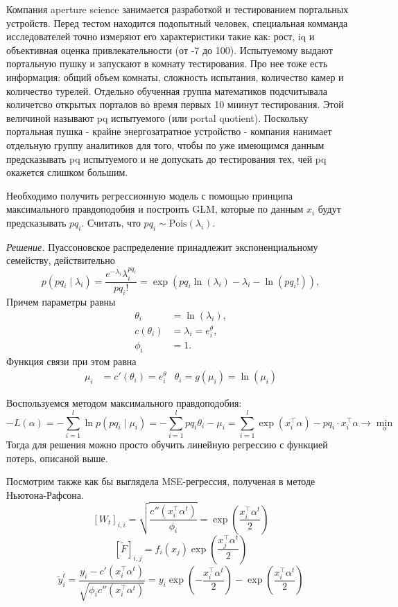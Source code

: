Компания aperture science занимается разработкой и тестированием портальных устройств. Перед тестом находится подопытный человек, специальная комманда исследователей точно измеряют его характеристики такие как: рост, iq и объективная оценка привлекательности (от -7 до 100). Испытуемому выдают портальную пушку и запускают в комнату тестирования. Про нее тоже есть информация: общий объем комнаты, сложность испытания, количество камер и количество турелей. Отдельно обученная группа математиков подсчитывала количетсво открытых порталов во время первых 10 миинут тестирования. Этой величиной называют pq испытуемого (или portal quotient). Поскольку портальная пушка - крайне энергозатратное устройство - компания нанимает отдельную группу аналитиков для того, чтобы по уже имеющимся данным предсказывать pq испытуемого и не допускать до тестирования тех, чей pq окажется слишком большим.

Необходимо получить регрессионную модель с помощью принципа максимального правдоподобия и построить GLM, которые по данным $x_i$ будут предсказывать $pq_i$. Считать, что $pq_i \sim \text{Pois}(\lambda_i)$.

\noindent\textit{Решение.}
Пуассоновское распределение принадлежит экспоненциальному семейству, действительно
$$
p(pq_i \mid \lambda_i) = \frac{e^{-\lambda_i}\lambda_i^{pq_i}}{pq_i!} = \exp\left(
pq_i\ln(\lambda_i) - \lambda_i - \ln(pq_i!)
\right),
$$
Причем параметры равны
\begin{align*}
  \theta_i &= \ln(\lambda_i),\\
  c(\theta_i) &= \lambda_i = e^\theta_i,\\
  \phi_i &= 1.
\end{align*}
Функция связи при этом равна
\begin{align*}
  \mu_i &= c'(\theta_i) = e^\theta_i &
  \theta_i = g(\mu_i) = \ln(\mu_i)
\end{align*}

Воспользуемся методом максимального правдоподобия:
$$
-L(\alpha) = -\sum_{i=1}^l \ln p(pq_i \mid \mu_i) = -\sum_{i=1}^l pq_i \theta_i - \mu_i =
\sum_{i=1}^l \exp\left(x_i^\top \alpha\right) - pq_i \cdot x_i^\top \alpha \to \min_\alpha
$$
Тогда для решения можно просто обучить линейную регрессию с функцией потерь, описаной выше.

Посмотрим также как бы выглядела MSE-регрессия, полученая в методе Ньютона-Рафсона.
$$
[W_t]_{i,i} = \sqrt{\frac{c''(x_i^\top\alpha^t)}{\phi_i}} = \exp\left(\frac{x_i^\top\alpha^t}{2}\right)
$$
$$
[\widetilde{F}]_{i,j} = f_i(x_j)\exp\left(\frac{x_j^\top\alpha^t}{2}\right)
$$
$$
\widetilde{y}^t_i = \frac{y_i - c'(x_i^\top\alpha^t)}{\sqrt{\phi_i c''(x_i^\top\alpha^t)}} = 
y_i\exp\left(-\frac{x_i^\top\alpha^t}{2}\right) - \exp\left(\frac{x_i^\top\alpha^t}{2}\right)
$$

